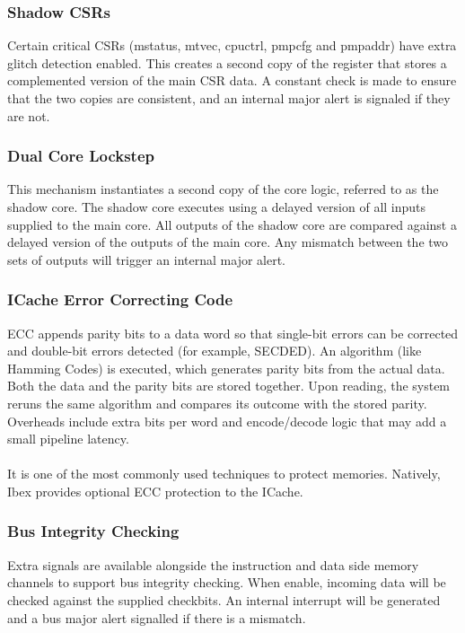 \subsubsection{Shadow CSRs}
 Certain critical \acp{CSR} (mstatus, mtvec, cpuctrl, pmpcfg and pmpaddr) have extra glitch detection enabled. This creates a second copy of the register that stores a complemented version of the main \ac{CSR} data. A constant check is made to ensure that the two copies are consistent, and an internal major alert is signaled if they are not.

\subsubsection{Dual Core Lockstep}
 This mechanism instantiates a second copy of the core logic, referred to as the shadow core. The shadow core executes using a delayed version of all inputs supplied to the main core. All outputs of the shadow core are compared against a delayed version of the outputs of the main core. Any mismatch between the two sets of outputs will trigger an internal major alert.

\subsubsection{ICache Error Correcting Code}
 \ac{ECC} appends parity bits to a data word so that single-bit errors can be corrected and double-bit errors detected (for example, \ac{SECDED}). An algorithm (like Hamming Codes) is executed, which generates parity bits from the actual data. Both the data and the parity bits are stored together. Upon reading, the system reruns the same algorithm and compares its outcome with the stored parity.\\
Overheads include extra bits per word and encode/decode logic that may add a small pipeline latency.\\\\
It is one of the most commonly used techniques to protect memories. Natively, Ibex provides optional \ac{ECC} protection to the ICache.

\subsubsection{Bus Integrity Checking}
 Extra signals are available alongside the instruction and data side memory channels to support bus integrity checking. When enable, incoming data will be checked against the supplied checkbits. An internal interrupt will be generated and a bus major alert signalled if there is a mismatch. 


